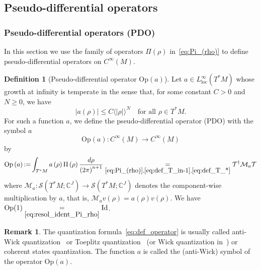 \documentclass[10pt]{amsart}
\theoremstyle{definition}\newtheorem{defi}[theo]{Definition}\newtheorem{rema}[theo]{Remark}\newtheorem{exam}[theo]{Example}\newtheorem{exem}[theo]{Example}\newtheorem{nota}[theo]{Notation}
\newcommand{\clS}{\mathcal{S}}
\newcommand{\clT}{\mathcal{T}}
\newcommand{\clM}{\mathcal{M}}
\newcommand{\Opp}{\mathrm{Op}}
\newcommand{\Id}{\mathrm{Id}}
\newcommand{\locc}{\mathrm{loc}}
\newcommand{\bbC}{\mathbb{C}}
\begin{document}
\subsection{Pseudo-differential operators}\label{subsec:Pseudo-differential-operator}

\subsubsection{Pseudo-differential operators (PDO)}

In this section we use the family of operators $\Pi(\rho)$ in~\eqref{eq:Pi_(rho)} to define pseudo-differential operators on $C^{\infty}(M)$.

\begin{cBoxA}{}
\begin{defi}[Pseudo-differential operator $\Opp(a)$]\label{def:Op}
Let $a\in L_{\locc }^{\infty}(T^{*}M)$ whose growth at infinity is temperate in the sense that, for some constant $C>0$ and $N\ge0$, we have
\begin{equation}\label{eq:symbol_temperate}
\left|a\left(\rho\right)\right|\le C\langle\left|\rho\right|\rangle^{N}\quad\text{for all }\rho\in T^{*}M.
\end{equation}
For such a function $a$, we define the pseudo-differential operator (PDO) with the symbol $a$
\[
\Opp\left(a\right):C^{\infty}\left(M\right)\to C^{\infty}\left(M\right)
\]
by
\begin{equation}\label{eq:def_operator}
\Opp\left(a\right){:=}\int_{T^{*}M}a\left(\rho\right)\Pi\left(\rho\right)\frac{d\rho}{\left(2\pi\right)^{n+1}}\underset{\eqref{eq:Pi_(rho)},\eqref{eq:def_T_in-1},\eqref{eq:def_T_*}}{=}\clT^{\dagger}\clM_{a}\clT
\end{equation}
where $\clM_{a}:\clS(T^{*}M;\bbC^{J})\rightarrow\clS(T^{*}M;\bbC^{J})$ denotes the component-wise multiplication by $a$, that is, $\clM_{a}v(\rho)=a(\rho)v(\rho)$. We have $\Opp(1)\underset{\eqref{eq:resol_ident_Pi_rho}}{=}\Id $.
\end{defi}
\end{cBoxA}

\begin{rema}
The quantization formula~\eqref{eq:def_operator} is usually called anti-Wick quantization~\cite[Defi.~1.7.3]{nicola_rodino_livre_11} or Toeplitz quantization~\cite[Chap.~13.4]{zworski_book_2012} (or Wick quantization in~\cite[Chap.~2.4.1]{lerner2011metrics}) or coherent states quantization. The function $a$ is called the (anti-Wick) symbol of the operator $\Opp(a)$.
\end{rema}
\end{document}
